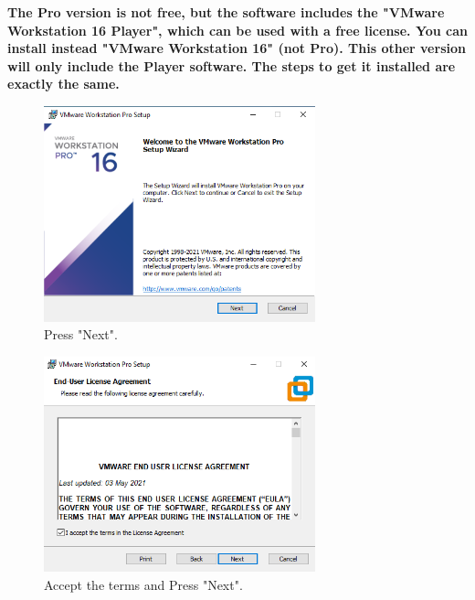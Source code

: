 \documentclass[a4paper]{article}
\begin{document}
    \vfill

    \begin{tcolorbox}[colback=red!5!white,colframe=red!75!black]
        \centering
        \textbf{
        The Pro version is not free, but the software includes the "VMware Workstation 16 Player", which can be
        used with a free license. You can install instead  "VMware Workstation 16" (not Pro). This other version will only
        include the Player software. The steps to get it installed are exactly the same.
        }
    \end{tcolorbox}

    \vfill

    \begin{figure}[h]
        \centering
        \includegraphics[width=0.7\textwidth]{Images/Install_VMware/Install_VMware_1.png}
        \caption{Press "Next".}    
    \end{figure}

    \vfill
    \clearpage    
    \begin{figure}
        \centering
        \includegraphics[width=0.7\textwidth]{Images/Install_VMware/Install_VMware_2.png}
        \caption{Accept the terms and Press "Next".}    
    \end{figure}
\end{document}
